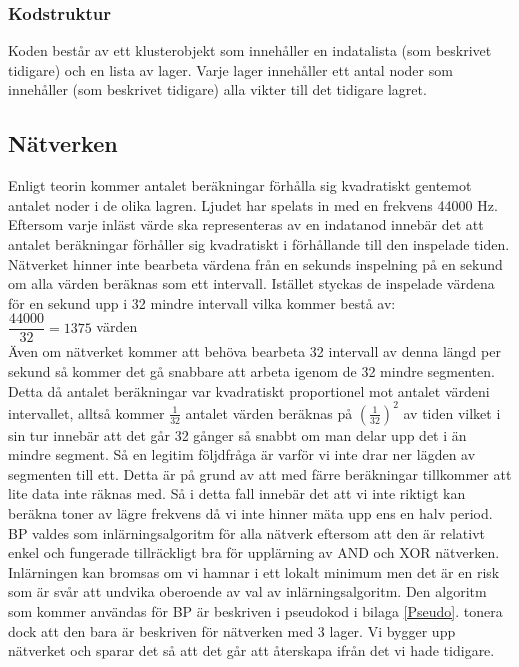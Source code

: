 \documentclass[a4paper,10pt]{article}
\begin{document}
\subsubsection{Kodstruktur}
Koden består av ett klusterobjekt som innehåller en indatalista (som beskrivet tidigare) och en lista av lager. Varje lager innehåller ett antal noder som innehåller (som beskrivet tidigare) alla vikter till det tidigare lagret.

\subsection{Nätverken}
Enligt teorin kommer antalet beräkningar förhålla sig kvadratiskt gentemot antalet noder i de olika lagren. Ljudet har spelats in med en frekvens 44000 Hz. Eftersom varje inläst värde ska representeras av en indatanod innebär det att antalet beräkningar förhåller sig kvadratiskt i förhållande till den inspelade tiden. Nätverket hinner inte bearbeta värdena från en sekunds inspelning på en sekund om alla värden beräknas som ett intervall. Istället styckas de inspelade värdena för en sekund upp i 32 mindre intervall vilka kommer bestå av: \\
	$\dfrac{44000}{32} = 1375$ värden \\
Även om nätverket kommer att behöva bearbeta 32 intervall av denna längd per sekund så kommer det gå snabbare att arbeta igenom de 32 mindre segmenten. Detta då antalet beräkningar var kvadratiskt proportionel mot antalet värdeni intervallet, alltså kommer $\frac{1}{32}$ antalet värden beräknas på $(\frac{1}{32})^2$ av tiden vilket i sin tur innebär att det går 32 gånger så snabbt om man delar upp det i än mindre segment. Så en legitim följdfråga är varför vi inte drar ner lägden av segmenten till ett. Detta är på grund av att med färre beräkningar tillkommer att lite data inte räknas med. Så i detta fall innebär det att vi inte riktigt kan beräkna toner av lägre frekvens då vi inte hinner mäta upp ens en halv period. 
BP valdes som inlärningsalgoritm för alla nätverk eftersom att den är relativt enkel och fungerade tillräckligt bra för upplärning av AND och XOR nätverken. Inlärningen kan bromsas om vi hamnar i ett lokalt minimum\autocite{NNDL} men det är en risk som är svår att undvika oberoende av val av inlärningsalgoritm.
Den algoritm som kommer användas för BP är beskriven i pseudokod i bilaga \ref{Pseudo}. tonera dock att den bara är beskriven för nätverken med 3 lager. Vi bygger upp nätverket och sparar det så att det går att återskapa ifrån det vi hade tidigare. 
\end{document}
